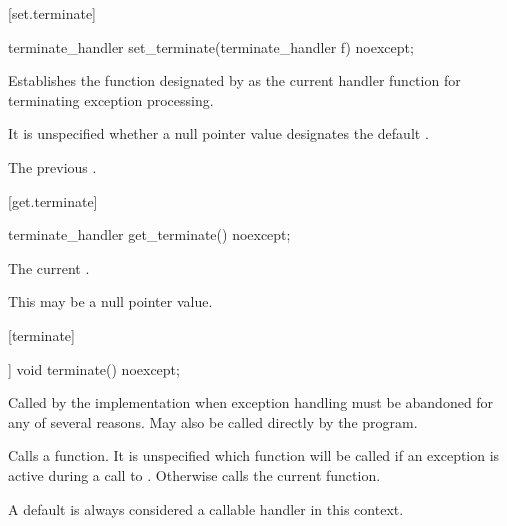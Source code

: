 [set.terminate]{}

%
\begin{itemdecl}
terminate_handler set_terminate(terminate_handler f) noexcept;
\end{itemdecl}

\begin{itemdescr}
\pnum
\effects
Establishes the function designated by  as the current
handler function for terminating exception processing.

\pnum
\remarks It is unspecified whether a null pointer value designates the default
.

\pnum
\returns
The previous .
\end{itemdescr}

[get.terminate]{}

%
\begin{itemdecl}
terminate_handler get_terminate() noexcept;
\end{itemdecl}

\begin{itemdescr}
\pnum
\returns The current .
\begin{note} This may be a null pointer value. \end{note}
\end{itemdescr}

[terminate]{}

%
\begin{itemdecl}
[[noreturn]] void terminate() noexcept;
\end{itemdecl}

\begin{itemdescr}
\pnum
\remarks
Called by the implementation when exception
handling must be abandoned for any of several reasons.
May also be called directly by the program.

\pnum
\effects
Calls a  function. It is unspecified which
 function will be called if an exception is active
during a call to .
Otherwise calls the current  function. \begin{note} A
default  is always considered a callable handler in
this context. \end{note}
\end{itemdescr}

